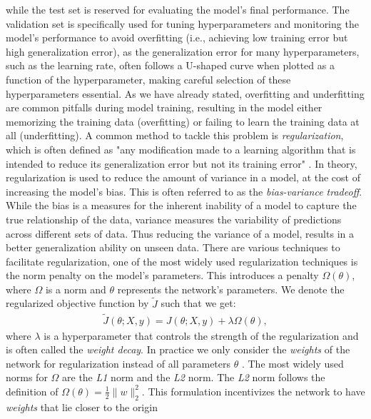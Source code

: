 while the test set is reserved for evaluating the model's final performance. 
The validation set is specifically used for tuning hyperparameters and monitoring the model's performance to avoid overfitting
(i.e., achieving low training error but high generalization error), as the generalization error
for many hyperparameters, such as the learning rate, often follows a U-shaped curve when plotted as a function
of the hyperparameter, making careful selection of these hyperparameters essential.
As we have already stated, overfitting and underfitting are common pitfalls during model training, resulting in the model either memorizing the training data (overfitting) 
or failing to learn the training data at all (underfitting).
 A common method to tackle this problem is \emph{regularization}, which is often defined as "any modification made to a learning algorithm that
is intended to reduce its generalization error but not its training error" \cite{Goodfellow-et-al-2016}.
In theory, regularization is used to reduce the amount of variance in a model, at the cost of increasing the model's
 bias. This is often referred to as the \emph{bias-variance tradeoff}. While the bias is a measures for the inherent inability of
 a model to capture the true relationship of the data, variance measures the variability of predictions across different 
sets of data. Thus reducing the variance of a model, results in a better generalization ability on unseen data\cite{IBMRegularization}.
There are various techniques to facilitate regularization, one of 
the most widely used regularization techniques is the norm penalty on the model's parameters. This introduces a penalty
\(\Omega(\theta)\), where \(\Omega\) is a norm and \(\theta\) represents the network's parameters.
We denote the regularized objective function by \(\tilde{J}\) such that we get:
\begin{align}
\tilde{J}(\theta; X, y) = J(\theta; X, y) + \lambda \Omega(\theta),
\end{align}
where \(\lambda\) is a hyperparameter that controls the strength of the regularization and is often called the \emph{weight decay}.
In practice we only consider the \emph{weights} of the network for regularization instead of  all parameters \(\theta\) \cite{Goodfellow-et-al-2016}.
The most widely used norms for \(\Omega\) are the \emph{L1} norm and the \emph{L2} norm.
The \emph{L2} norm follows the definition of \(\Omega(\theta) = \frac{1}{2} \|w\|_2^2\).
This formulation incentivizes the network to have \emph{weights} that lie closer to the origin
